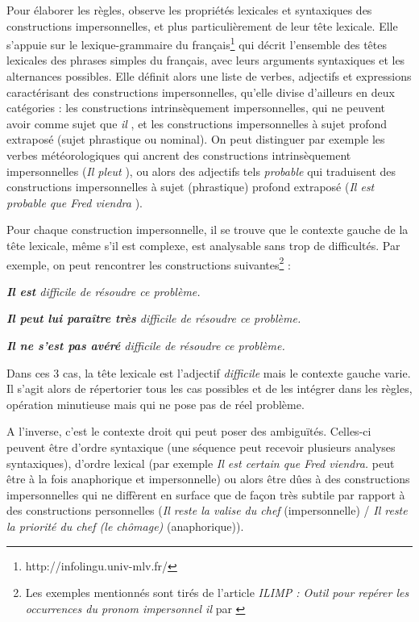 \documentclass[a4paper,12pt]{article}
\begin{document}
Pour élaborer les règles, \citeauthor{danlos-ilimp-taln2005} observe les propriétés lexicales et syntaxiques des constructions impersonnelles, et plus particulièrement de leur tête lexicale. Elle s'appuie sur le lexique-grammaire du français\footnote{http://infolingu.univ-mlv.fr/} \citep{gross-halshs-00278309,leclere-hal-00192888}
 qui décrit l'ensemble des têtes lexicales des phrases simples du français, avec leurs arguments syntaxiques et les alternances possibles.
Elle définit alors une liste de verbes, adjectifs et expressions caractérisant des constructions impersonnelles, qu'elle divise d'ailleurs en deux catégories : les constructions intrinsèquement impersonnelles, qui ne peuvent avoir comme sujet que \og \textit{il} \fg{}, et les constructions impersonnelles à sujet profond extraposé (sujet phrastique ou nominal). On peut distinguer par exemple les verbes météorologiques qui ancrent des constructions intrinsèquement impersonnelles (\og \textit{Il pleut} \fg{}), ou alors des adjectifs tels \og \textit{probable} \fg{} qui traduisent des constructions impersonnelles à sujet (phrastique) profond extraposé (\og \textit{Il est probable que Fred viendra} \fg{}).

Pour chaque construction impersonnelle, il se trouve que le contexte gauche de la tête lexicale, même s'il est complexe, est analysable sans trop de difficultés.
Par exemple, on peut rencontrer les constructions suivantes\footnote{Les exemples mentionnés sont tirés de l'article \textit{ILIMP : Outil pour repérer les occurrences du pronom impersonnel il} par \citet{danlos-ilimp-taln2005}} :

\og{}\textit{\textbf{Il est} difficile de résoudre ce problème.}\fg{}

\og{}\textit{\textbf{Il peut lui paraître très} difficile de résoudre ce problème.}\fg{}

\og{}\textit{\textbf{Il ne s'est pas avéré} difficile de résoudre ce problème.}\fg{}

Dans ces 3 cas, la tête lexicale est l'adjectif \og \textit{difficile} \fg{} mais le contexte gauche varie. Il s'agit alors de répertorier tous les cas possibles et de les intégrer dans les règles, opération minutieuse mais qui ne pose pas de réel problème.

A l'inverse, c'est le contexte droit qui peut poser des ambiguïtés. Celles-ci peuvent être d'ordre syntaxique (une séquence peut recevoir plusieurs analyses syntaxiques), d'ordre lexical (par exemple \og{}\textit{Il est certain que Fred viendra.}\fg{} peut être à la fois anaphorique et impersonnelle) ou alors être dûes à des constructions impersonnelles qui ne diffèrent en surface que de façon très subtile par rapport à des constructions personnelles (\og{}\textit{Il reste la valise du chef}\fg{} (impersonnelle) / \og{}\textit{Il reste la priorité du chef (le chômage)}\fg{} (anaphorique)).
\end{document}
